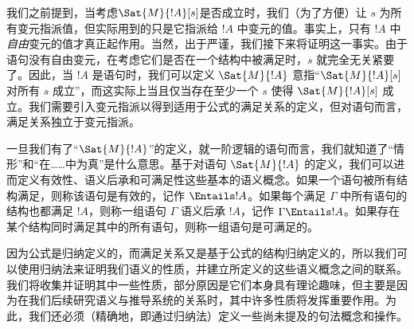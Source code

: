\documentclass[../../../include/open-logic-section]{subfiles}
\begin{document}


我们之前提到，当考虑$\Sat{M}{!A}[s]$是否成立时，我们（为了方便）让 $s$ 为所有变元指派值，但实际用到的只是它指派给 $!A$ 中变元的值。事实上，只有 $!A$ 中\emph{自由}变元的值才真正起作用。当然，出于严谨，我们接下来将证明这一事实。由于语句没有自由变元，在考虑它们是否在一个结构中被满足时，$s$ 就完全无关紧要了。因此，当 $!A$ 是语句时，我们可以定义 $\Sat{M}{!A}$ 意指“$\Sat{M}{!A}[s]$对所有 $s$ 成立”，而这实际上当且仅当存在至少一个 $s$ 使得 $\Sat{M}{!A}[s]$ 成立。我们需要引入变元指派以得到适用于公式的满足关系的定义，但对语句而言，满足关系独立于变元指派。

一旦我们有了“$\Sat{M}{!A}$”的定义，就一阶逻辑的语句而言，我们就知道了“情形”和“在……中为真”是什么意思。基于对语句 $\Sat{M}{!A}$ 的定义，我们可以进而定义有效性、语义后承和可满足性这些基本的语义概念。如果一个语句被所有结构满足，则称该语句是有效的，记作 $\Entails !A$。如果每个满足 $\Gamma$ 中所有语句的结构也都满足 $!A$，则称一组语句 $\Gamma$ 语义后承 $!A$，记作 $\Gamma \Entails !A$。如果存在某个结构同时满足其中的所有语句，则称一组语句是可满足的。

因为公式是归纳定义的，而满足关系又是基于公式的结构归纳定义的，所以我们可以使用归纳法来证明我们语义的性质，并建立所定义的这些语义概念之间的联系。我们将收集并证明其中一些性质，部分原因是它们本身具有理论趣味，但主要是因为在我们后续研究语义与推导系统的关系时，其中许多性质将发挥重要作用。为此，我们还必须（精确地，即通过归纳法）定义一些尚未提及的句法概念和操作。
\end{document}
